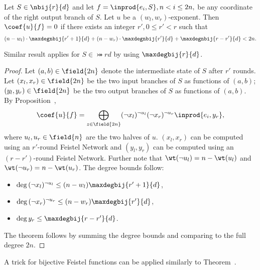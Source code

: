 \begin{theorem}
Let $S \in \nbij{r}{d}$ and let $f = \inprod{e_i, S}, n < i \le 2n,$ be any coordinate of the right output branch of $S$.
Let $u$ be a $(w_l,w_r)$-exponent. Then $\coef{u}{f} = 0$ if there exists an integer $r', 0 \le r' < r$ such that
$$
(n - w_l)\cdot\maxdegnbij{r'+1}{d} + (n - w_r)\cdot\maxdegnbij{r'}{d} + \maxdegnbij{r-r'}{d} < 2n.
$$

Similar result applies for $S \in \bij{r}{d}$ by using $\maxdegbij{r}{d}$.
\end{theorem}
\begin{proof}
Let $(a, b) \in \field{2n}$ denote the intermediate state of $S$ after $r'$ rounds. Let $(x_l,x_r) \in \field{2n}$ be the two input branches of $S$ as functions of $(a,b)$; $(y_l,y_r) \in \field{2n}$ be the two output branches of $S$ as functions of $(a,b)$. By Proposition~,
$$
\coef{u}{f} = \bigoplus_{z \in \field{2n}}
    (\lnot x_l)^{\lnot u_l} 
    (\lnot x_r)^{\lnot u_r} 
    \inprod{e_i, y_r},
$$
where $u_l,u_r \in \field{n}$ are the two halves of $u$.
$(x_l,x_r)$ can be computed using an $r'$-round Feistel Network and $(y_l,y_r)$ can be computed using an $(r-r')$-round Feistel Network. Further note that $\wt(\lnot u_l) = n - \wt(u_l)$ and $\wt(\lnot u_r) = n - \wt(u_r)$. The degree bounds follow:
\begin{itemize}
    \item $\deg{(\lnot x_l)^{\lnot u_l} } \le (n - w_l)\maxdegbij{r'+1}{d}$,
    \item $\deg{(\lnot x_r)^{\lnot u_r} } \le (n - w_r)\maxdegbij{r'}{d}$,
    \item $\deg{y_r} \le \maxdegbij{r - r'}{d}$.
\end{itemize}
The theorem follows by summing the degree bounds and comparing to the full degree $2n$.
\end{proof}

A trick for bijective Feistel functions can be applied similarly to Theorem~.

